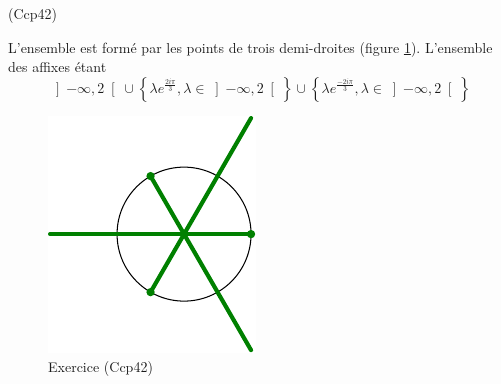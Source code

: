 \begin{tiny}(Ccp42)\end{tiny} L'ensemble est formé par les points de trois demi-droites (figure \ref{fig:Ccp42_1}). L'ensemble des affixes étant
\begin{displaymath}
 \left] -\infty, 2\right[ 
 \cup
 \left\lbrace \lambda e^{\frac{2i\pi}{3}}, \lambda \in \left] -\infty, 2\right[\right\rbrace 
 \cup
 \left\lbrace \lambda e^{\frac{-2i\pi}{3}}, \lambda \in  \left] -\infty, 2\right[\right\rbrace 
\end{displaymath}
\begin{figure}
 \centering
 \includegraphics{./Ccp42_1.pdf}
 \caption{Exercice \theenumi \hspace{0.2cm}\tiny{(Ccp42)}}
 \label{fig:Ccp42_1}
\end{figure}

